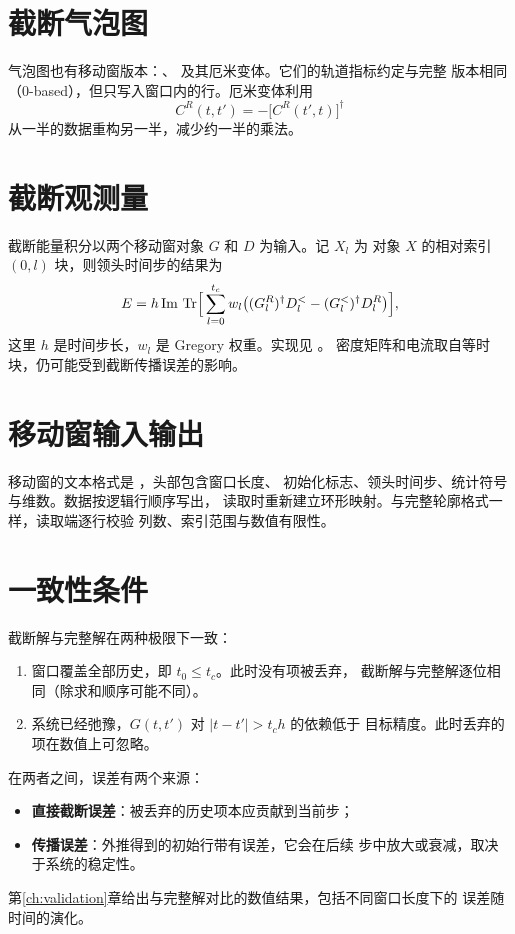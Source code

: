 \section{截断气泡图}
\label{sec:moving-bubble}

气泡图也有移动窗版本：、
 及其厄米变体。它们的轨道指标约定与完整
版本相同（0-based），但只写入窗口内的行。厄米变体利用
\begin{equation}
    C^{R}(t,t') = -\big[C^{R}(t',t)\big]^{\dagger}
\end{equation}
从一半的数据重构另一半，减少约一半的乘法。

\section{截断观测量}
\label{sec:moving-observables}

截断能量积分以两个移动窗对象 $G$ 和 $D$ 为输入。记 $X_l$ 为
对象 $X$ 的相对索引 $(0,l)$ 块，则领头时间步的结果为
\begin{equation}
    E = h\,\mathrm{Im}\,\operatorname{Tr}\!\Big[\sum_{l=0}^{t_c}w_l
    \big((G_l^R)^\dagger D_l^<-(G_l^<)^\dagger D_l^R\big)\Big],
\end{equation}
这里 $h$ 是时间步长，$w_l$ 是 Gregory 权重。实现见 。
密度矩阵和电流取自等时块，仍可能受到截断传播误差的影响。

\section{移动窗输入输出}
\label{sec:moving-io}

移动窗的文本格式是 ，头部包含窗口长度、
初始化标志、领头时间步、统计符号与维数。数据按逻辑行顺序写出，
读取时重新建立环形映射。与完整轮廓格式一样，读取端逐行校验
列数、索引范围与数值有限性。

\section{一致性条件}
\label{sec:moving-consistency}

截断解与完整解在两种极限下一致：
\begin{enumerate}[label=(\arabic*)]
    \item 窗口覆盖全部历史，即 $t_0\le t_c$。此时没有项被丢弃，
          截断解与完整解逐位相同（除求和顺序可能不同）。
    \item 系统已经弛豫，$G(t,t')$ 对 $|t-t'|>t_c h$ 的依赖低于
          目标精度。此时丢弃的项在数值上可忽略。
\end{enumerate}
在两者之间，误差有两个来源：
\begin{itemize}
    \item \textbf{直接截断误差}：被丢弃的历史项本应贡献到当前步；
    \item \textbf{传播误差}：外推得到的初始行带有误差，它会在后续
          步中放大或衰减，取决于系统的稳定性。
\end{itemize}
第\ref{ch:validation}章给出与完整解对比的数值结果，包括不同窗口长度下的
误差随时间的演化。
